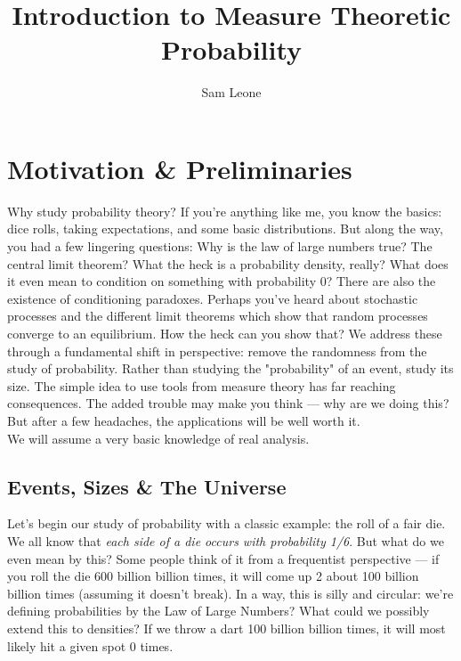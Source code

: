 \documentclass{report}
\title{Introduction to Measure Theoretic Probability}
\author{Sam Leone}
\begin{document}
\maketitle
\chapter{Motivation \& Preliminaries}

Why study probability theory? If you're anything like me, you know the basics: dice rolls, taking expectations, and
some basic distributions. But along the way, you had a few lingering questions: Why is the law of large numbers true?
The central limit theorem? What the heck is a probability density, really? What does it even mean to condition on
something with probability 0? There are also the existence of conditioning paradoxes. Perhaps you've heard about
stochastic processes and the different limit theorems which show that random processes converge to an equilibrium.
How the heck can you show that? We address these through a fundamental shift in perspective: remove the randomness from the study of probability. 
Rather than studying the "probability" of an event, study its size. The simple idea to use tools from measure theory
has far reaching consequences. The added trouble may make you think — why are we doing this? But after a few headaches,
the applications will be well worth it. \\

We will assume a very basic knowledge of real analysis.

\section{Events, Sizes \& The Universe}

Let's begin our study of probability with a classic example: the roll of a fair die. 
We all know that \emph{each side of a die occurs with probability 1/6}. But what do we even 
mean by this? Some people think of it from a frequentist perspective — if you roll the die 
600 billion billion times, it will come up 2 about 100 billion billion times (assuming it doesn't break). 
In a way, this is silly and circular: we're defining probabilities by the Law of Large Numbers? 
What could we possibly extend this to densities? If we throw a dart 100 billion billion times, 
it will most likely hit a given spot 0 times. \\ 
\end{document}
